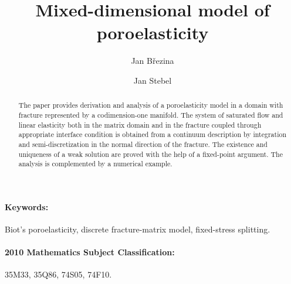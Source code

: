 \documentclass[a4paper]{article}
\numberwithin{equation}{section}
\begin{document}
\title{Mixed-dimensional model of poroelasticity}
\author{Jan Březina}
\author{Jan Stebel}
\maketitle

\begin{abstract}
The paper provides derivation and analysis of a poroelasticity model in a domain with fracture represented by a codimension-one manifold. The system of saturated flow and linear elasticity both in the matrix domain and in the fracture coupled through appropriate interface condition is obtained from a continuum description by integration and semi-discretization in the normal direction of the fracture.
The existence and uniqueness of a weak solution are proved with the help of a fixed-point argument.
The analysis is complemented by a numerical example.
\end{abstract}

\paragraph{Keywords:}
Biot's poroelasticity, discrete fracture-matrix model, fixed-stress splitting.

\paragraph{2010 Mathematics Subject Classification:}
35M33, %
35Q86, %
74S05, %
74F10. %
\end{document}
